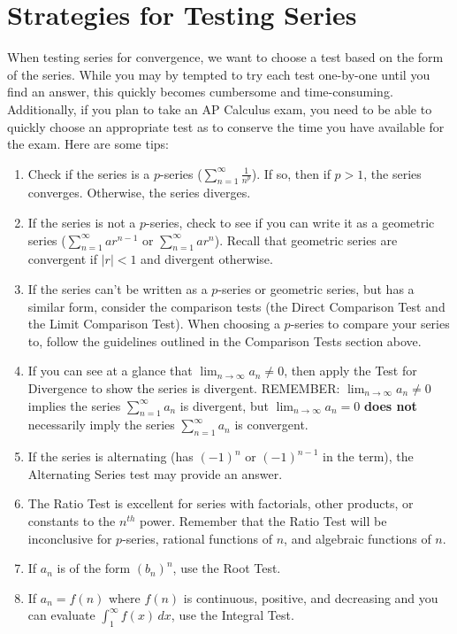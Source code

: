 \section{Strategies for Testing Series}
When testing series for convergence, we want to choose a test based on the 
form of the series. While you may by tempted to try each test one-by-one until 
you find an answer, this quickly becomes cumbersome and time-consuming. 
Additionally, if you plan to take an AP Calculus exam, you need to be able to 
quickly choose an appropriate test as to conserve the time you have available 
for the exam. Here are some tips:
\begin{enumerate}
\item Check if the series is a $p$-series ($\sum_{n=1}^\infty \frac{1}{n^p}$). 
If so, then if $p > 1$, the series converges. Otherwise, the series diverges.
\item If the series is not a $p$-series, check to see if you can write it as a 
geometric series ($\sum_{n=1}^\infty ar^{n-1}$ or $\sum_{n=1}^\infty ar^n$). 
Recall that geometric series are convergent if $|r| < 1$ and divergent otherwise.
\item If the series can't be written as a $p$-series or geometric series, but 
has a similar form, consider the comparison tests (the Direct Comparison Test 
and the Limit Comparison Test). When choosing a $p$-series to compare your 
series to, follow the guidelines outlined in the Comparison Tests section 
above. 
\item If you can see at a glance that $\lim_{n \to \infty} a_n \neq 0$, then 
apply the Test for Divergence to show the series is divergent. REMEMBER: $\lim_
{n \to \infty} a_n \neq 0$ implies the series $\sum_{n=1}^\infty a_n$ is 
divergent, but $\lim_{n \to \infty} a_n = 0$ \textbf{does not} necessarily imply the 
series $\sum_{n=1}^\infty a_n$ is convergent. 
\item If the series is alternating (has $(-1)^n$ or $(-1)^{n-1}$ in the term), 
the Alternating Series test may provide an answer. 
\item The Ratio Test is excellent for series with factorials, other products, 
or constants to the $n^{th}$ power. Remember that the Ratio Test will be 
inconclusive for $p$-series, rational functions of $n$, and algebraic functions 
of $n$. 
\item If $a_n$ is of the form $(b_n)^n$, use the Root Test. 
\item If $a_n = f(n)$ where $f(n)$ is continuous, positive, and decreasing and 
you can evaluate $\int_1^\infty f(x)\,dx$, use the Integral Test. 
\end{enumerate}

